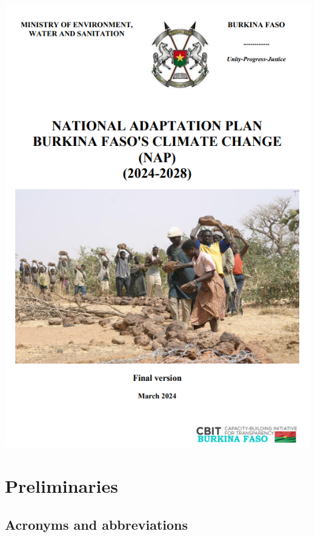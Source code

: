 \documentclass[
]{book}
\author{}
\date{\vspace{-2.5em}}
\begin{document}
{
\setcounter{tocdepth}{1}
\tableofcontents
}
\chapter*{}\label{section}

\includegraphics[width=6.25in,height=\textheight]{Figures and Photos/Cover Page.PNG}

\chapter*{Preliminaries}\label{preliminaries}

\section*{Acronyms and abbreviations}\label{acronyms-and-abbreviations}
\end{document}
